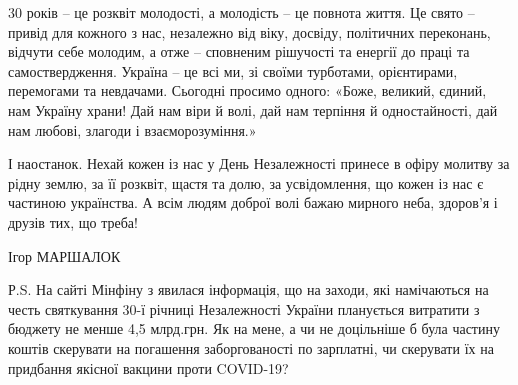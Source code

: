 30 років – це розквіт молодості, а молодість – це повнота життя. Це свято –
привід для кожного з нас, незалежно від віку, досвіду, політичних переконань,
відчути себе молодим, а отже – сповненим рішучості та енергії до праці та
самоствердження. Україна – це всі ми, зі своїми турботами, орієнтирами,
перемогами та невдачами. Сьогодні просимо одного: «Боже, великий, єдиний, нам
Україну храни! Дай нам віри й волі, дай нам терпіння й одностайності, дай нам
любові, злагоди і взаєморозуміння.»

І наостанок. Нехай кожен із нас у День Незалежності принесе в офіру молитву за
рідну землю, за її розквіт, щастя та долю, за усвідомлення, що кожен із нас є
частиною українства. А всім людям доброї волі бажаю мирного неба, здоров'я і
друзів тих, що треба!

Ігор МАРШАЛОК

Р.S. На сайті Мінфіну з явилася інформація, що на заходи, які намічаються на
честь святкування 30-ї річниці Незалежності України планується  витратити з
бюджету не менше 4,5 млрд.грн. Як на мене, а чи не доцільніше б була частину
коштів скерувати на погашення заборгованості по зарплатні, чи скерувати їх на
придбання якісної вакцини проти COVID-19?

